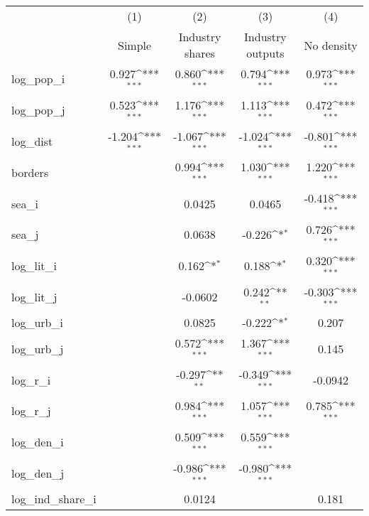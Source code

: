 {
\def\sym#1{\ifmmode^{#1}\else\(^{#1}\)\fi}
\begin{longtable}{l*{4}{c}}
\hline\hline\endfirsthead\hline\endhead\hline\endfoot\endlastfoot
            &\multicolumn{1}{c}{(1)}&\multicolumn{1}{c}{(2)}&\multicolumn{1}{c}{(3)}&\multicolumn{1}{c}{(4)}\\
            &\multicolumn{1}{c}{Simple}&\multicolumn{1}{c}{Industry shares}&\multicolumn{1}{c}{Industry outputs}&\multicolumn{1}{c}{No density}\\
\hline
log\_pop\_i   &       0.927\sym{***}&       0.860\sym{***}&       0.794\sym{***}&       0.973\sym{***}\\
log\_pop\_j   &       0.523\sym{***}&       1.176\sym{***}&       1.113\sym{***}&       0.472\sym{***}\\
log\_dist    &      -1.204\sym{***}&      -1.067\sym{***}&      -1.024\sym{***}&      -0.801\sym{***}\\
borders     &                     &       0.994\sym{***}&       1.030\sym{***}&       1.220\sym{***}\\
sea\_i       &                     &      0.0425         &      0.0465         &      -0.418\sym{***}\\
sea\_j       &                     &      0.0638         &      -0.226\sym{*}  &       0.726\sym{***}\\
log\_lit\_i   &                     &       0.162\sym{*}  &       0.188\sym{*}  &       0.320\sym{***}\\
log\_lit\_j   &                     &     -0.0602         &       0.242\sym{**} &      -0.303\sym{***}\\
log\_urb\_i   &                     &      0.0825         &      -0.222\sym{*}  &       0.207         \\
log\_urb\_j   &                     &       0.572\sym{***}&       1.367\sym{***}&       0.145         \\
log\_r\_i     &                     &      -0.297\sym{**} &      -0.349\sym{***}&     -0.0942         \\
log\_r\_j     &                     &       0.984\sym{***}&       1.057\sym{***}&       0.785\sym{***}\\
log\_den\_i   &                     &       0.509\sym{***}&       0.559\sym{***}&                     \\
log\_den\_j   &                     &      -0.986\sym{***}&      -0.980\sym{***}&                     \\
log\_ind\_share\_i&                     &      0.0124         &                     &       0.181         \\

\end{longtable}}
